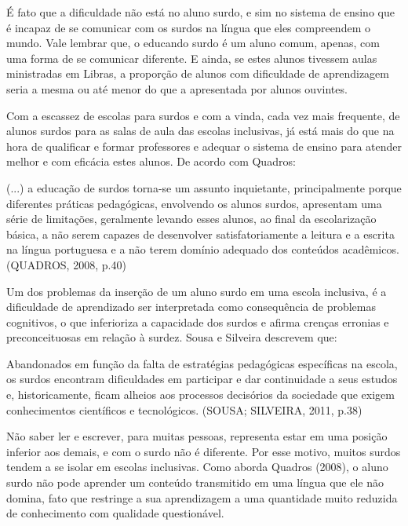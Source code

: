 \documentclass[brasil]{abnt}
\begin{document}
	É fato que a dificuldade não está no aluno surdo, e sim no sistema de ensino que é incapaz de se comunicar com os surdos na língua que eles compreendem o mundo. Vale lembrar que, 
	o educando surdo é um aluno comum, apenas, com uma forma de se comunicar diferente. E ainda, se estes alunos tivessem aulas ministradas em Libras, a proporção de alunos com dificuldade 
	de aprendizagem seria a mesma ou até menor do que a apresentada por alunos ouvintes.
	
	Com a escassez de escolas para surdos e com a vinda, cada vez mais frequente, de alunos surdos para as salas de aula das escolas inclusivas, já está mais do que na hora de 
	qualificar e formar professores e adequar o sistema de ensino para atender melhor e com eficácia estes alunos. De acordo com Quadros:
	
		\begin{citacao}(...) a educação de surdos torna-se um assunto inquietante, principalmente porque diferentes práticas pedagógicas, envolvendo os alunos surdos, apresentam
						uma série de limitações, geralmente levando esses alunos, ao final da escolarização básica, a não serem capazes de desenvolver satisfatoriamente a leitura 
						e a escrita na língua portuguesa e a não terem domínio adequado dos conteúdos acadêmicos. (QUADROS, 2008, p.40)
		\end{citacao}
	
	Um dos problemas da inserção de um aluno surdo em uma escola inclusiva, é a dificuldade de aprendizado ser interpretada como consequência de problemas cognitivos, o que inferioriza
	a capacidade dos surdos e afirma crenças erronias e preconceituosas em relação à surdez. Sousa e Silveira descrevem que:
	
		\begin{citacao} Abandonados em função da falta de estratégias pedagógicas específicas na escola, os surdos encontram dificuldades em participar e dar continuidade a
						seus estudos e, historicamente, ficam alheios aos processos 
						decisórios da sociedade que exigem conhecimentos científicos e 
						tecnológicos. (SOUSA; SILVEIRA, 2011, p.38)
		\end{citacao}
		
	Não saber ler e escrever, para muitas pessoas, representa estar em uma posição inferior aos demais, e com o surdo não é diferente. Por esse motivo, muitos surdos tendem a se isolar em
	escolas inclusivas. Como aborda Quadros (2008), o aluno surdo não pode aprender um conteúdo transmitido em uma língua que ele não domina, fato que restringe a sua aprendizagem a uma 
	quantidade muito reduzida de conhecimento com qualidade questionável. 
	
\end{document}
